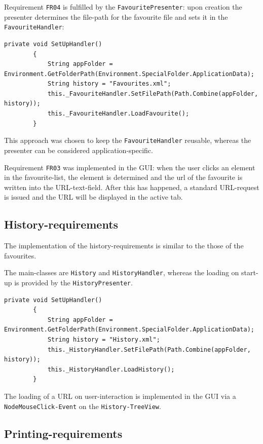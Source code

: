 Requirement \texttt{FR04} is fulfilled by the  \texttt{FavouritePresenter}: upon creation the presenter determines the file-path for the favourite file and sets it in the \texttt{FavouriteHandler}:

\begin{lstlisting}
private void SetUpHandler()
        {
            String appFolder = Environment.GetFolderPath(Environment.SpecialFolder.ApplicationData);
            String history = "Favourites.xml";
            this._FavouriteHandler.SetFilePath(Path.Combine(appFolder, history));
            this._FavouriteHandler.LoadFavourite();
        }
\end{lstlisting}

This approach was chosen to keep the \texttt{FavouriteHandler} reusable, whereas the presenter can be considered application-specific.

Requirement \texttt{FR03} was implemented in the \ac{GUI}: when the user clicks an element in the favourite-list, the element is determined and the url of the favourite is written into the \ac{URL}-text-field. After this has happened, a standard \ac{URL}-request is issued and the \ac{URL} will be displayed in the active tab.

\subsection{History-requirements}

The implementation of the history-requirements is similar to the those of the favourites.

The main-classes are \texttt{History} and \texttt{HistoryHandler}, whereas the loading on start-up is provided by the \texttt{HistoryPresenter}.

\begin{lstlisting}
private void SetUpHandler()
        {
            String appFolder = Environment.GetFolderPath(Environment.SpecialFolder.ApplicationData);
            String history = "History.xml";
            this._HistoryHandler.SetFilePath(Path.Combine(appFolder, history));
            this._HistoryHandler.LoadHistory();
        }
\end{lstlisting}

The loading of a \ac{URL} on user-interaction is implemented in the \ac{GUI} via a \texttt{NodeMouseClick-Event} on the \texttt{History-TreeView}.

\subsection{Printing-requirements}


